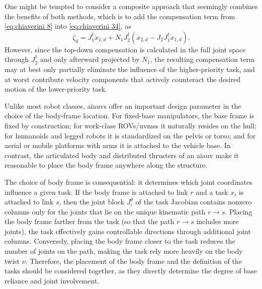 \documentclass[../main.tex]{subfiles}
\begin{document}
\begin{remark} %
    One might be tempted to consider a composite approach that seemingly combines the benefits of both methods, which is to add the compensation term from \eqref{eq:chiaverini 8} into \eqref{eq:chiaverini 34}, as %
\begin{equation}
\label{eq:hybrid}
    \zeta_{d} = J_1^{\dagger} \dot{x}_{1,d} + N_1 J_2^{\dagger} \left(\dot{x}_{2,d} - J_2 J_1^{\dagger} \dot{x}_{1,d}\right).
\end{equation}
    However, since the top-down compensation is calculated in the full joint space through \( J_2^\dagger \) and only afterward projected by \( N_1 \), the resulting compensation term may at best only partially eliminate the influence of the higher-priority task, and at worst contribute velocity components that actively counteract the desired motion of the lower-priority task.
\end{remark} %



Unlike most robot classes, \glspl{aiauv} offer an important design parameter in the choice of the body-frame location. For fixed-base manipulators, the base frame is fixed by construction; for work-class ROVs/\glspl{uvms} it naturally resides on the hull; for humanoids and legged robots it is standardized on the pelvis or torso; and for aerial or mobile platforms with arms it is attached to the vehicle base. In contrast, the articulated body and distributed thrusters of an \gls{aiauv} make it reasonable to place the body frame anywhere along the structure.

The choice of body frame is consequential: it determines which joint coordinates influence a given task. If the body frame is attached to link \( r \) and a task \( x_i \) is attached to link \( s \), then the joint block \( J^\theta_i \) of the task Jacobian contains nonzero columns only for the joints that lie on the unique kinematic path \( r\! \to\! s \). Placing the body frame farther from the task (so that the path \( r\! \to\! s \) includes more joints), the task effectively gains controllable directions through additional joint columns. Conversely, placing the body frame closer to the task reduces the number of joints on the path, making the task rely more heavily on the body twist \( \nu \). Therefore, the placement of the body frame and the definition of the tasks should be considered together, as they directly determine the degree of base reliance and joint involvement.
\end{document}
